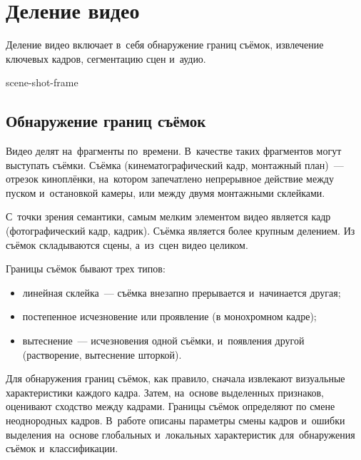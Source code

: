 
\section{Деление видео}

Деление видео включает в~себя обнаружение границ съёмок,
извлечение ключевых кадров, сегментацию сцен и~аудио.

\begin{figuredt}
    {scene-shot-frame}
\end{figuredt}

\subsection{Обнаружение границ съёмок}

Видео делят на~фрагменты по~времени.
В~качестве таких фрагментов могут выступать съёмки.
Съёмка (кинематографический кадр,
монтажный план)~— отрезок киноплёнки,
на~котором запечатлено непрерывное действие между пуском
и~остановкой камеры, или между двумя монтажными склейками.

С~точки зрения семантики, самым мелким элементом видео является кадр
(фотографический кадр, кадрик).
Съёмка является более крупным делением.
Из съёмок складываются сцены, а~из~сцен видео целиком.

Границы съёмок бывают трех типов:
\begin{itemize}
    \item линейная склейка~— съёмка внезапно прерывается и~начинается другая;
    \item постепенное исчезновение или проявление (в монохромном кадре);
    \item вытеснение~— исчезновения одной съёмки, и~появления другой
        (растворение, вытеснение шторкой).
\end{itemize}

Для обнаружения границ съёмок, как правило,
сначала извлекают визуальные характеристики каждого кадра.
Затем, на~основе выделенных признаков, оценивают сходство между кадрами.
Границы съёмок определяют по смене неоднородных кадров.
В~работе \cite{Nigay:1993} описаны параметры смены кадров
и~ошибки выделения на~основе глобальных и~локальных характеристик
для~обнаружения съёмок и~классификации.

